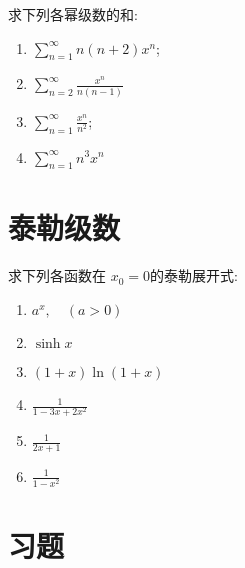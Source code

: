 \begin{problem}
    求下列各幂级数的和:
    \begin{enumerate}
        \item \(\sum_{n=1}^{\infty} n(n + 2) x^n\);
        \item \(\sum_{n=2}^{\infty} \frac{x^n}{n(n - 1)}\)
        \item \(\sum_{n=1}^{\infty} \frac{x^n}{n^2}\);
        \item \(\sum_{n=1}^{\infty} n^{3}x^{n}\)
    \end{enumerate}
\end{problem}
\section{泰勒级数}

\begin{problem}
    求下列各函数在 \(x_0 = 0\)的泰勒展开式:
    \begin{enumerate}
        \item \(a^x, \quad (a > 0)\)
        \item \(\sinh x\)
        \item \((1 + x) \ln(1 + x)\)
        \item \(\frac{1}{1 - 3x + 2x^2}\)
        \item \(\frac{1}{2x+1}\)
        \item \(\frac{1}{1 - x^2}\)
    \end{enumerate}
\end{problem}
\section{习题}
